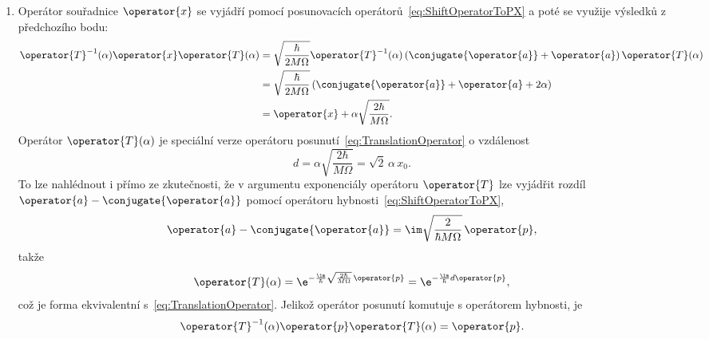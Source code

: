 \begin{solution}
\begin{enumerate}
	\item
		Operátor souřadnice $\operator{x}$ se vyjádří pomocí posunovacích operátorů~\eqref{eq:ShiftOperatorToPX} a poté se využije výsledků z předchozího bodu:
		\begin{align}
			\operator{T}^{-1}(\alpha)\operator{x}\operator{T}(\alpha)
				&=\sqrt{\frac{\hbar}{2M\Omega}}\operator{T}^{-1}(\alpha)
					\left(\conjugate{\operator{a}}+\operator{a}\right)\operator{T}(\alpha)\nonumber\\
				&=\sqrt{\frac{\hbar}{2M\Omega}}\left(\conjugate{\operator{a}}+\operator{a}+2\alpha\right)\nonumber\\
				&=\operator{x}+\alpha\sqrt{\frac{2\hbar}{M\Omega}}.
		\end{align}
		Operátor $\operator{T}(\alpha)$ je speciální verze operátoru posunutí~\eqref{eq:TranslationOperator} o vzdálenost
		\begin{equation}
            d
                =\alpha\sqrt{\frac{2\hbar}{M\Omega}}
                =\sqrt{2}\,\alpha\,x_{0}.
		\end{equation}
		To lze nahlédnout i přímo ze zkutečnosti, že v argumentu exponenciály operátoru	$\operator{T}$ lze vyjádřit rozdíl $\operator{a}-\conjugate{\operator{a}}$ pomocí operátoru hybnosti~\eqref{eq:ShiftOperatorToPX},
		\begin{equation}
            \operator{a}-\conjugate{\operator{a}}
                =\im\sqrt{\frac{2}{\hbar M\Omega}}\,\operator{p},
		\end{equation}
		takže
		\begin{equation}
			\operator{T}(\alpha)
				=\e^{-\frac{\im}{\hbar}\sqrt{\frac{2\hbar}{M\Omega}}\,\operator{p}}
				=\e^{-\frac{\im}{\hbar}d\operator{p}},
		\end{equation}
		což je forma ekvivalentní s~\eqref{eq:TranslationOperator}.
		Jelikož operátor posunutí komutuje s operátorem hybnosti, je
		\begin{equation}
            \operator{T}^{-1}(\alpha)\operator{p}\operator{T}(\alpha)
                =\operator{p}.
		\end{equation}		


\end{enumerate}
\end{solution}
